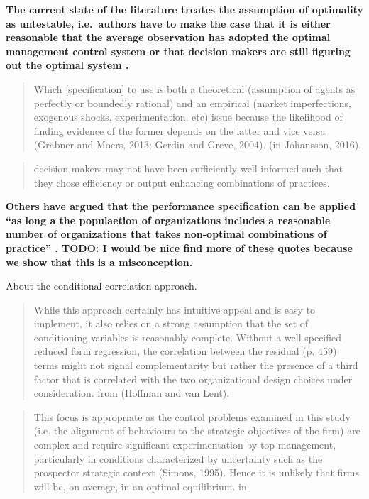 \documentclass[12pt]{article}
\begin{document}
\textbf{The current state of the literature treates the assumption of optimality as untestable, i.e.~authors have to make the case that it is either reasonable that the average observation has adopted the optimal management control system or that decision makers are still figuring out the optimal system \citep{Grabner2013}.}

\begin{quote}
Which {[}specification{]} to use is both a theoretical (assumption of agents as perfectly or boundedly rational) and an empirical (market imperfections, exogenous shocks, experimentation, etc) issue because the likelihood of finding evidence of the former depends on the latter and vice versa (Grabner and Moers, 2013; Gerdin and Greve, 2004). (in Johansson, 2016).
\end{quote}

\begin{quote}
decision makers may not have been sufficiently well informed such that they chose efficiency or output enhancing combinations of practices.
\citep{Carree2011}
\end{quote}

\textbf{Others have argued that the performance specification can be applied ``as long a the populaetion of organizations includes a reasonable number of organizations that takes non-optimal combinations of practice'' \citep{Carree2011}. TODO: I would be nice find more of these quotes because we show that this is a misconception.}

About the conditional correlation approach.
\begin{quote}
While this approach certainly has intuitive appeal and is easy to implement, it also relies on a strong assumption that the set of conditioning variables is reasonably complete. Without a well-specified reduced form regression, the correlation between the residual (p. 459) terms might not signal complementarity but rather the presence of a third factor that is correlated with the two organizational design choices under consideration. from (Hoffman and van Lent).
\end{quote}

\begin{quote}
This focus is appropriate as the control problems examined in this study (i.e. the alignment of behaviours to the strategic objectives of the firm) are complex and require significant experimentation by top management, particularly in conditions characterized by uncertainty such as the prospector strategic context (Simons, 1995). Hence it is unlikely that firms will be, on average, in an optimal equilibrium. in \citep{Bedford2016}
\end{quote}
\end{document}

